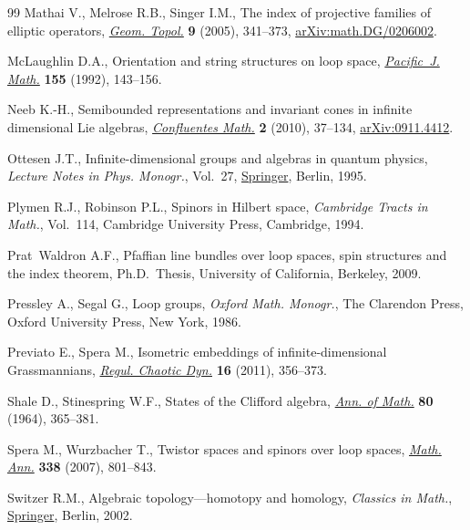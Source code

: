 \begin{thebibliography}{99}
Mathai V., Melrose R.B., Singer I.M., The index of projective families of
 elliptic operators,  \href{https://doi.org/10.2140/gt.2005.9.341}{\textit{Geom. Topol.}} \textbf{9} (2005), 341--373,
 \href{https://arxiv.org/abs/math.DG/0206002}{arXiv:math.DG/0206002}.

McLaughlin D.A., Orientation and string structures on loop space,
 \href{https://doi.org/10.2140/pjm.1992.155.143}{\textit{Pacific~J. Math.}} \textbf{155} (1992), 143--156.

Neeb K.-H., Semibounded representations and invariant cones in infinite
 dimensional {L}ie algebras, \href{https://doi.org/10.1142/S1793744210000132}{\textit{Confluentes Math.}} \textbf{2} (2010),
 37--134, \href{https://arxiv.org/abs/0911.4412}{arXiv:0911.4412}.

Ottesen J.T., Infinite-dimensional groups and algebras in quantum physics,
 \textit{Lecture Notes in Phys. Monogr.}, Vol.~27,  \href{https://doi.org/10.1007/978-3-540-49141-5}{Springer}, Berlin, 1995.

Plymen R.J., Robinson P.L., Spinors in {H}ilbert space, \textit{Cambridge
 Tracts in Math.}, Vol.~114, Cambridge University Press, Cambridge, 1994.

Prat~Waldron A.F., Pfaffian line bundles over loop spaces, spin structures and
 the index theorem, Ph.D.~Thesis, {U}niversity of {C}alifornia, {B}erkeley,
 2009.

Pressley A., Segal G., Loop groups, \textit{Oxford Math. Monogr.}, The Clarendon Press,
 Oxford University Press, New York, 1986.

Previato E., Spera M., Isometric embeddings of infinite-dimensional
 {G}rassmannians, \href{https://doi.org/10.1134/S1560354711030099}{\textit{Regul. Chaotic Dyn.}} \textbf{16} (2011), 356--373.

Shale D., Stinespring W.F., States of the {C}lifford algebra, \href{https://doi.org/10.2307/1970397}{\textit{Ann. of
 Math.}} \textbf{80} (1964), 365--381.

Spera M., Wurzbacher T., Twistor spaces and spinors over loop spaces,
  \href{https://doi.org/10.1007/s00208-007-0085-3}{\textit{Math. Ann.}} \textbf{338} (2007), 801--843.

Switzer R.M., Algebraic topology---homotopy and homology, \textit{Classics in Math.},
  \href{https://doi.org/10.1007/978-3-642-61923-6}{Springer}, Berlin, 2002.


\end{thebibliography}
